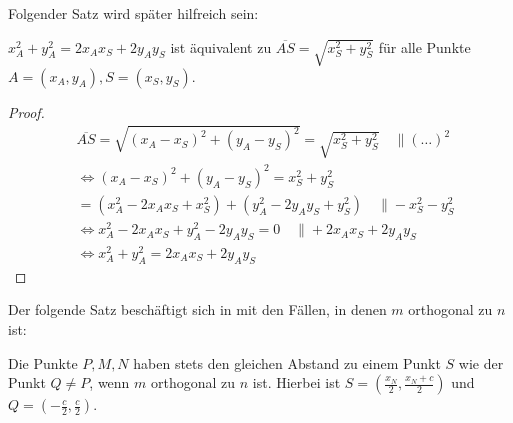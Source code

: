 Folgender Satz wird später hilfreich sein:
\begin{thm}\label{cor_hilfe}
        $x_A^2+y_A^2=2x_Ax_S+2y_Ay_S$ ist äquivalent zu $\overline{AS}=\sqrt{x_S^2+y_S^2}$ für alle 
        Punkte $A=(x_A, y_A), S=(x_S, y_S)$.
\end{thm}
\begin{proof}
    \begin{align*}
        &\overline{AS}=\sqrt{(x_A-x_S)^2+(y_A-y_S)^2}=\sqrt{x_S^2+y_S^2}\quad\|(\ldots)^2\\
        &\Leftrightarrow (x_A-x_S)^2+(y_A-y_S)^2=x_S^2+y_S^2\\
        &=(x_A^2-2x_Ax_S+x_S^2)+(y_A^2-2y_Ay_S+y_S^2)\quad \|-x_S^2-y_S^2\\
        &\Leftrightarrow x_A^2-2x_Ax_S+y_A^2-2y_Ay_S=0\quad \|+2x_Ax_S+2y_Ay_S\\
        &\Leftrightarrow x_A^2+y_A^2=2x_Ax_S+2y_Ay_S
    \end{align*}
\end{proof}
Der folgende Satz beschäftigt sich in mit den Fällen, in denen $m$ orthogonal zu $n$ ist:
\begin{thm}\label{aufgabe_3}
    Die Punkte $P, M, N$ haben stets den gleichen Abstand zu einem Punkt $S$ wie der Punkt $Q\neq P$, wenn $m$ 
    orthogonal zu $n$ ist. Hierbei ist $S=\left(\frac{x_N}{2}, \frac{x_N+c}{2}\right)$ und $Q=\left(-\frac{c}{2}, 
    \frac{c}{2}\right)$.
\end{thm}
